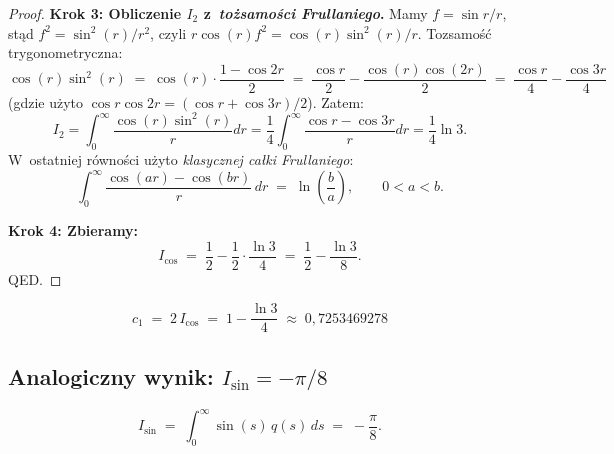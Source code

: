 \begin{proof}
\textbf{Krok 3: Obliczenie $I_2$ z~\emph{to\.zsamo\'sci Frullaniego}.}
Mamy $f = \sin r/r$, st\k{a}d $f^2 = \sin^2(r)/r^2$, czyli
$r \cos(r) f^2 = \cos(r) \sin^2(r)/r$. Tozsamo\'s\'c trygonometryczna:
\[
  \cos(r) \sin^2(r) \;=\; \cos(r)\cdot\frac{1 - \cos 2r}{2}
  \;=\; \frac{\cos r}{2} - \frac{\cos(r)\cos(2r)}{2}
  \;=\; \frac{\cos r}{4} - \frac{\cos 3r}{4}
\]
(gdzie u\.zyto $\cos r \cos 2r = (\cos r + \cos 3r)/2$).
Zatem:
\[
  I_2 = \int_0^\infty \frac{\cos(r)\sin^2(r)}{r}dr
      = \frac{1}{4}\int_0^\infty \frac{\cos r - \cos 3r}{r} dr
      = \frac{1}{4}\ln 3.
\]
W~ostatniej r\'owno\'sci u\.zyto \emph{klasycznej ca\l{}ki Frullaniego}:
\begin{equation}\label{eq:T5-frullani}
  \int_0^\infty \frac{\cos(ar) - \cos(br)}{r}\, dr \;=\; \ln\!\left(\frac{b}{a}\right),
  \qquad 0 < a < b.
\end{equation}

\textbf{Krok 4: Zbieramy:}
\[
  I_{\cos} \;=\; \frac{1}{2} - \frac{1}{2}\cdot\frac{\ln 3}{4} \;=\; \frac{1}{2} - \frac{\ln 3}{8}.
\]
QED.
\end{proof}

\begin{corollary}\label{cor:T5-c1}
\begin{equation}\label{eq:T5-c1-final}
  \boxed{\; c_1 \;=\; 2\,I_{\cos} \;=\; 1 - \frac{\ln 3}{4} \;\approx\; 0{,}7253469278 \;}
\end{equation}
\end{corollary}

\subsection{Analogiczny wynik: $I_{\sin} = -\pi/8$}
\label{app:T5-Isin}

\begin{proposition}[Ca\l{}ka sinusowa]\label{prop:T5-Isin}
\begin{equation}\label{eq:T5-Isin}
  I_{\sin} \;=\; \int_0^\infty \sin(s)\,q(s)\,ds \;=\; -\frac{\pi}{8}.
\end{equation}
\end{proposition}


